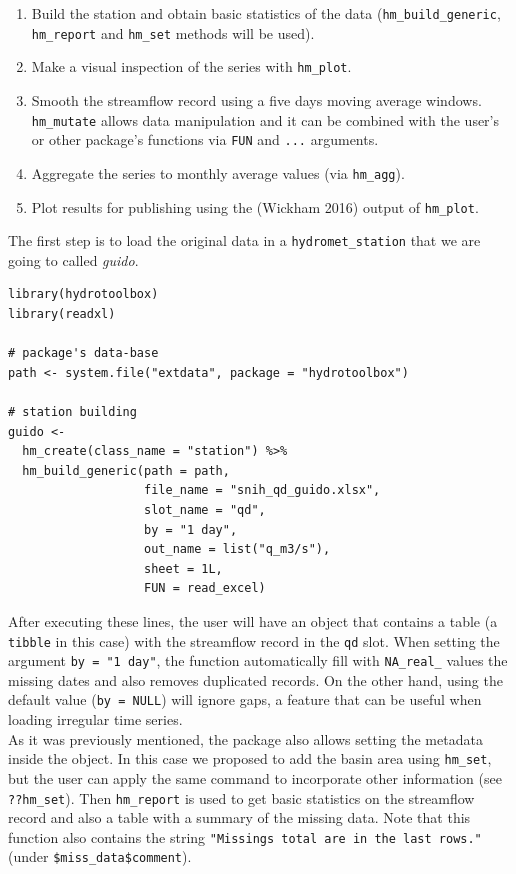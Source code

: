 \begin{enumerate}
\def\labelenumi{\alph{enumi}.}
\item
  Build the station and obtain basic statistics of the data
  (\texttt{hm\_build\_generic}, \texttt{hm\_report} and \texttt{hm\_set} methods will be used).
\item
  Make a visual inspection of the series with \texttt{hm\_plot}.
\item
  Smooth the streamflow record using a five days moving average
  windows. \texttt{hm\_mutate} allows data manipulation and it can be combined
  with the user's or other package's functions via \texttt{FUN} and \texttt{...}
  arguments.
\item
  Aggregate the series to monthly average values (via \texttt{hm\_agg}).
\item
  Plot results for publishing using the  (Wickham 2016)
  output of \texttt{hm\_plot}.
\end{enumerate}

\noindent 
The first step is to load the original data in a
\texttt{hydromet\_station} that we are going to called \emph{guido}.

\begin{verbatim}
library(hydrotoolbox)
library(readxl)

# package's data-base
path <- system.file("extdata", package = "hydrotoolbox")

# station building
guido <- 
  hm_create(class_name = "station") %>%
  hm_build_generic(path = path, 
                   file_name = "snih_qd_guido.xlsx", 
                   slot_name = "qd",
                   by = "1 day", 
                   out_name = list("q_m3/s"), 
                   sheet = 1L, 
                   FUN = read_excel)
\end{verbatim}

\noindent 
After executing these lines, the user will have an object that
contains a table (a \texttt{tibble} in this case) with the streamflow record in
the \texttt{qd} slot. When setting the argument \texttt{by\ =\ "1\ day"}, the function
automatically fill with \texttt{NA\_real\_} values the missing dates and also removes
duplicated records. On the other hand, using the default value (\texttt{by\ =\ NULL})
will ignore gaps, a feature that can be useful when loading
irregular time series.\\
As it was previously mentioned, the package also allows setting the
metadata inside the object. In this case we proposed to add the
basin area using \texttt{hm\_set}, but the user can apply the same command
to incorporate other information (see \texttt{??hm\_set}). Then \texttt{hm\_report}
is used to get basic statistics on the streamflow
record and also a table with a summary of the missing data. Note that this
function also contains the string
\texttt{"Missings\ total\ are\ in\ the\ last\ rows."}
(under \texttt{\$miss\_data\$comment}).

